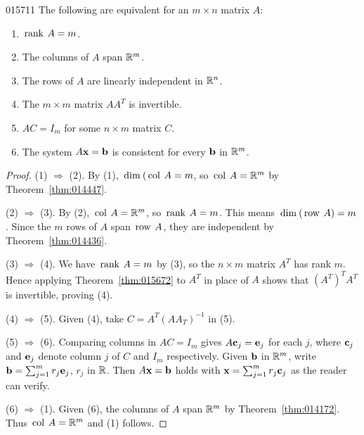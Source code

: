 {{\begin{theorem}{}{015711} %
The following are equivalent for an $m \times n$ matrix $A$:

\begin{enumerate}
\item $\thinspace\operatorname{rank\medspace} A = m$.

\item The columns of $A$ span $\mathbb{R}^m$.

\item The rows of $A$ are linearly independent in $\mathbb{R}^n$.

\item The $m \times m$ matrix $AA^T$ is invertible.

\item $AC = I_m$ for some $n \times m$ matrix $C$.

\item The system $A\textbf{x} = \textbf{b}$ is consistent for every $\textbf{b}$ in $\mathbb{R}^m$.

\end{enumerate}
\end{theorem}

\begin{proof}
(1) $\Rightarrow$ (2). By (1), $\thinspace\operatorname{dim\medspace}(\thinspace\operatorname{col\medspace} A = m$, so $\thinspace\operatorname{col\medspace} A = \mathbb{R}^m$ by Theorem~\ref{thm:014447}.

(2) $\Rightarrow$ (3). By (2), $\thinspace\operatorname{col\medspace} A = \mathbb{R}^m$, so $\thinspace\operatorname{rank\medspace} A = m$. This means $\thinspace\operatorname{dim\medspace}(\thinspace\operatorname{row\medspace} A) = m$. Since the $m$ rows of $A$ span $\thinspace\operatorname{row\medspace} A$, they are independent by Theorem~\ref{thm:014436}.

(3) $\Rightarrow$ (4). We have $\thinspace\operatorname{rank\medspace} A = m$ by (3), so the $n \times m$ matrix $A^{T}$ has rank $m$. Hence applying Theorem~\ref{thm:015672} to $A^{T}$ in place of $A$ shows that $(A^{T})^{T}A^{T}$ is invertible, proving (4).

(4) $\Rightarrow$ (5). Given (4), take $C = A^{T}(AA_{T})^{-1}$ in (5).

(5) $\Rightarrow$ (6). Comparing columns in $AC = I_{m}$ gives $A\textbf{c}_{j} = \textbf{e}_{j}$ for each $j$, where $\textbf{c}_{j}$ and $\textbf{e}_{j}$ denote column $j$ of $C$ and $I_{m}$ respectively. Given $\textbf{b}$ in $\mathbb{R}^m$, write $\textbf{b} = \sum_{j=1}^{m} r_j\textbf{e}_j$, $r_{j}$ in $\mathbb{R}$. Then $A\textbf{x} = \textbf{b}$ holds with $\textbf{x}= \sum_{j=1}^{m} r_j\textbf{c}_j $ as the reader can verify.

(6) $\Rightarrow$ (1). Given (6), the columns of $A$ span $\mathbb{R}^m$ by Theorem~\ref{thm:014172}. Thus $\thinspace\operatorname{col\medspace} A = \mathbb{R}^m$ and (1) follows.
\end{proof}

}}
